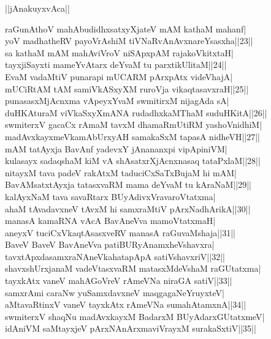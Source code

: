 \documentclass{article}
\begin{document}
\begin{center}
||jAnakuyxvAca||
\end{center}

raGunAthoV mahAbudidhxsatxyXjateV mAM kathaM mahanf|\\
yoV madhatheRV payoVrAshiM tiVNaRvAnAvxnareYsasxha||23||\\
sa kathaM mAM mahAviVroV niSApxpAM rajakoVkitxtaH|\\
tayxjiSayxti mameYvAtarx deYvaM tu parxtikUlitaM||24||\\
EvaM vadaMtiV punarapi mUCARM pArxpAtx videVhajA|\\
mUCiRtAM tAM samiVkASxyXM ruroVja vikaqtasavxraH||25||\\
punasasxMjAcnxma vApeyxYvaM swmitirxM nijagAda sA|\\
duHKAturaM viVkaSxyXmANA rudadhxkaMThaM suduHKitA||26||\\
swmiterxV gacaCx rAmaM tavxM dhamaRmUtiRM yashoVnidhiM|\\
madAvxkayxmeVkamAbUrxyAH samakaSxM tapasA nidheVH||27||\\
mAM tatAyxja BavAnf yadevxY jAnananxpi vipApiniVM|\\
kulasayx sadaqshaM kiM vA shAsatxrXjAcnxnasaq tataPxlaM||28||\\
nitayxM tava padeV rakAtxM taduciCxSaTxBujaM hi mAM|\\
BavAMsatxtAyxja tatasxvaRM mama deYvaM tu kAraNaM||29||\\
kalAyxNaM tava savaRtarx BUyAdivxVravaroVtatxma|\\
ahaM tAvadavxneV tAvxM hi samxraMtiV pArxNadhArikA||30||\\
manasA kamaRNA vAcA BavAneVva mamoVtatxmaH|\\
aneyxV tuciCxVkaqtAsasxveRV manasA raGuvaMshaja||31||\\
BaveV BaveV BavAneVva patiBURyAnamxheVshavxra|\\
tavxtApxdasamxraNAneVkahatapApA satiVshavxriV||32||\\
shavxshUrxjanaM vadeVtasxvaRM matasxMdeVshaM raGUtatxma|\\
tayxkAtx vaneV mahAGoVreV rAmeVNa niraGA satiV||33||\\
samxrAmi caraNw yuSamxdavxneV maqgagaNeYruyxteV|\\
aMtavaRtinxV vaneV tayxkAtx rAmeVNa sumahAtamxnA||34||\\
swmiterxV shaqNu madAvxkayxM BadarxM BUyAdarxGUtatxmeV|\\
idAniVM saMtayxjeV pArxNAnArxmaviVrayxM surakaSxtiV||35||\\
\end{document}
